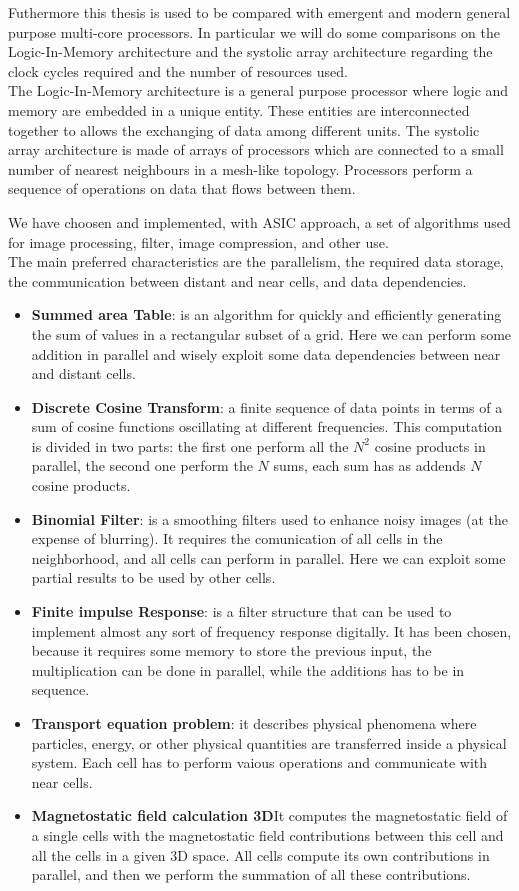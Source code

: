 \documentclass[12pt]{report}
\begin{document}
	Futhermore this thesis is used to be compared with emergent and modern general purpose multi-core processors.
	In particular we will do some comparisons on the Logic-In-Memory architecture and the systolic array architecture regarding the clock cycles required and the number of resources used.\\
	The Logic-In-Memory architecture is a general purpose processor where logic and memory are embedded in a unique entity. These entities are interconnected together to allows the exchanging of data among different units.
	The systolic array architecture is made of arrays of processors which are connected to a small number of nearest neighbours in a mesh-like topology. Processors perform a sequence of operations on data that flows between them.
	
	
	We have choosen and implemented, with ASIC approach, a set of algorithms used for image processing, filter, image compression, and other use.\\
	The main preferred characteristics are the parallelism, the required data storage, the communication between distant and near cells, and data dependencies.
	\begin{itemize}
		\item \textbf{Summed area Table}: is an algorithm for quickly and efficiently generating the sum of values in a rectangular subset of a grid. Here we can perform some addition in parallel and wisely exploit some data dependencies between near and distant cells.
		\item \textbf{Discrete Cosine Transform}: a finite sequence of data points in terms of a sum of cosine functions oscillating at different frequencies. This computation is divided in two parts: the first one perform all the $ N^2 $ cosine products in parallel, the second one perform the $N $ sums, each sum has as addends $N$ cosine products.
		\item \textbf{Binomial Filter}: is a smoothing filters used to enhance noisy images (at the expense of blurring). It requires the comunication of all cells in the neighborhood, and all cells can perform in parallel. Here we can exploit some partial results to be used by other cells.
		\item \textbf{Finite impulse Response}: is a filter structure that can be used to implement almost any sort of frequency response digitally. It has been chosen, because it requires some memory to store the previous input, the multiplication can be done in parallel, while the additions has to be in sequence.
		\item \textbf{Transport equation problem}: it describes physical phenomena where particles, energy, or other physical quantities are transferred inside a physical system. Each cell has to perform vaious operations and communicate with near cells.
		\item \textbf{Magnetostatic field calculation 3D}It computes the magnetostatic field of a single cells with the magnetostatic field contributions between this cell and all the cells in a given 3D space.	All cells compute its own contributions in parallel, and then we perform the summation of all these contributions.		\end{itemize}
	
\end{document}
